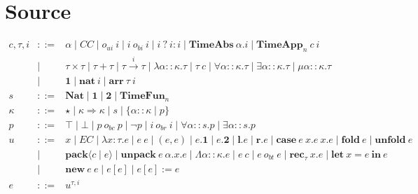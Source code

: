 \documentclass[fleqn]{article}
\begin{document}
\section{Source}

\[
\begin{array}{rcl}
    c,\tau,i & ::= & \alpha \mid CC \mid o_{ui}~i \mid i~o_{bi}~i \mid i~?~i:i \mid \mathbf{TimeAbs}~\alpha. i \mid \mathbf{TimeApp}_n~c~i \\
    & \mid & \tau \times \tau \mid \tau + \tau \mid \tau \xrightarrow{i} \tau \mid \lambda \alpha :: \kappa. \tau \mid \tau~c \mid \forall \alpha :: \kappa. \tau \mid \exists \alpha :: \kappa. \tau \mid \mu \alpha :: \kappa. \tau \\
    & \mid & \mathbf{1} \mid \mathbf{nat}~i \mid \mathbf{arr}~\tau~i \\
    s & ::= & \mathbf{Nat} \mid \mathbf{1} \mid \mathbf{2} \mid \mathbf{TimeFun}_n \\
    \kappa & ::= & \star \mid \kappa \Rightarrow \kappa \mid s \mid \{ \alpha :: \kappa \mid p \} \\
    p & ::= & \top \mid \bot \mid p~o_{bc}~p \mid \neg p \mid i~o_{br}~i \mid \forall \alpha :: s. p \mid \exists \alpha :: s. p \\
    u & ::= & x \mid EC \mid \lambda x:\tau. e \mid e~e \mid (e,e) \mid e.\mathbf{1} \mid e.\mathbf{2} \mid \mathbf{l}.e \mid \mathbf{r}.e \mid \mathbf{case}~e~x.e~x.e \mid \mathbf{fold}~e \mid \mathbf{unfold}~e \\
    & \mid & \mathbf{pack}\langle c \mid e \rangle \mid \mathbf{unpack}~e~\alpha.x.e \mid \Lambda \alpha :: \kappa. e \mid e~c \mid e~o_{bt}~e \mid \mathbf{rec}_\tau~x.e \mid \mathbf{let}~x=e~\mathbf{in}~e \\
    & \mid & \mathbf{new}~e~e \mid e[e] \mid e[e] := e \\
    e & ::= & u^{\tau,i}
\end{array}
\]
\end{document}
